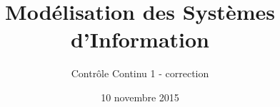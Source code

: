 \title{
   Modélisation des Systèmes d'Information
}
\author{
	Contrôle Continu 1 - correction
}
\date{10 novembre 2015}
